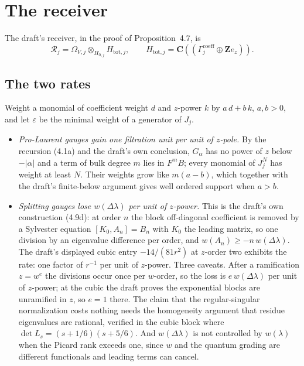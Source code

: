 \documentclass[11pt]{article}
\theoremstyle{definition}
\theoremstyle{remark}
\newcommand{\C}{\mathbf C}
\newcommand{\Z}{\mathbf Z}
\begin{document}
\section{The receiver}
\label{sec:receiver}

The draft's receiver, in the proof of Proposition~4.7, is
\[
  \mathscr R_j=\Omega_{V,j}\otimes_{H_{0,j}}H_{\mathrm{tot},j},
  \qquad
  H_{\mathrm{tot},j}=\C(\!(\Gamma^{\mathrm{coeff}}_j\oplus\Z e_z)\!).
  \tag{4.4c}
\]

\subsection*{The two rates}

Weight a monomial of coefficient weight $d$ and $z$-power $k$ by $a\,d+b\,k$,
$a,b>0$, and let $\varepsilon$ be the minimal weight of a generator of $J_j$.

\begin{itemize}
\item \emph{Pro-Laurent gauges gain one filtration unit per unit of $z$-pole.}
  By the recursion (4.1a) and the draft's own conclusion, $G_\alpha$ has no
  power of $z$ below $-|\alpha|$ and a term of bulk degree $m$ lies in $F^mB$;
  every monomial of $J_j^N$ has weight at least $N$. Their weights grow like
  $m(a-b)$, which together with the draft's finite-below argument gives well
  ordered support when $a>b$.
\item \emph{Splitting gauges lose $w(\Delta\lambda)$ per unit of $z$-power.}
  This is the draft's own construction (4.9d): at order $n$ the block
  off-diagonal coefficient is removed by a Sylvester equation $[K_0,A_n]=B_n$
  with $K_0$ the leading matrix, so one division by an eigenvalue difference per
  order, and $w(A_n)\ge-n\,w(\Delta\lambda)$. The draft's displayed cubic entry
  $-14/(81r^2)$ at $z$-order two exhibits the rate: one factor of $r^{-1}$ per
  unit of $z$-power. Three caveats. After a ramification $z=w^e$ the divisions
  occur once per $w$-order, so the loss is $e\,w(\Delta\lambda)$ per unit of
  $z$-power; at the cubic the draft proves the exponential blocks are
  unramified in $z$, so $e=1$ there. The claim that the regular-singular
  normalization costs nothing needs the homogeneity argument that residue
  eigenvalues are rational, verified in the cubic block where
  $\det L_s=(s+1/6)(s+5/6)$. And $w(\Delta\lambda)$ is not controlled by
  $w(\lambda)$ when the Picard rank exceeds one, since $w$ and the quantum
  grading are different functionals and leading terms can cancel.
\end{itemize}
\end{document}

